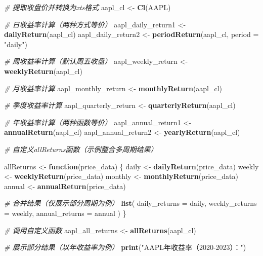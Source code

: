 \documentclass[]{ctexbook}
\newenvironment{Shaded}{\begin{snugshade}}{\end{snugshade}}
\newcommand{\AttributeTok}[1]{\textcolor[rgb]{0.13,0.29,0.53}{#1}}
\newcommand{\CommentTok}[1]{\textcolor[rgb]{0.56,0.35,0.01}{\textit{#1}}}
\newcommand{\ControlFlowTok}[1]{\textcolor[rgb]{0.13,0.29,0.53}{\textbf{#1}}}
\newcommand{\FunctionTok}[1]{\textcolor[rgb]{0.13,0.29,0.53}{\textbf{#1}}}
\newcommand{\NormalTok}[1]{#1}
\newcommand{\OtherTok}[1]{\textcolor[rgb]{0.56,0.35,0.01}{#1}}
\newcommand{\StringTok}[1]{\textcolor[rgb]{0.31,0.60,0.02}{#1}}
\begin{document}
\begin{Shaded}
\begin{Highlighting}[]
\CommentTok{\# 提取收盘价并转换为xts格式}
\NormalTok{aapl\_cl }\OtherTok{\textless{}{-}} \FunctionTok{Cl}\NormalTok{(AAPL)}

\CommentTok{\# 日收益率计算（两种方式等价）}
\NormalTok{aapl\_daily\_return1 }\OtherTok{\textless{}{-}} \FunctionTok{dailyReturn}\NormalTok{(aapl\_cl)}
\NormalTok{aapl\_daily\_return2 }\OtherTok{\textless{}{-}} \FunctionTok{periodReturn}\NormalTok{(aapl\_cl, }\AttributeTok{period =} \StringTok{"daily"}\NormalTok{)}

\CommentTok{\# 周收益率计算（默认周五收盘）}
\NormalTok{aapl\_weekly\_return }\OtherTok{\textless{}{-}} \FunctionTok{weeklyReturn}\NormalTok{(aapl\_cl)}

\CommentTok{\# 月收益率计算}
\NormalTok{aapl\_monthly\_return }\OtherTok{\textless{}{-}} \FunctionTok{monthlyReturn}\NormalTok{(aapl\_cl)}

\CommentTok{\# 季度收益率计算}
\NormalTok{aapl\_quarterly\_return }\OtherTok{\textless{}{-}} \FunctionTok{quarterlyReturn}\NormalTok{(aapl\_cl)}

\CommentTok{\# 年收益率计算（两种函数等价）}
\NormalTok{aapl\_annual\_return1 }\OtherTok{\textless{}{-}} \FunctionTok{annualReturn}\NormalTok{(aapl\_cl)}
\NormalTok{aapl\_annual\_return2 }\OtherTok{\textless{}{-}} \FunctionTok{yearlyReturn}\NormalTok{(aapl\_cl)}

\CommentTok{\# 自定义allReturns函数（示例整合多周期结果）}

\NormalTok{allReturns }\OtherTok{\textless{}{-}} \ControlFlowTok{function}\NormalTok{(price\_data) \{}
\NormalTok{  daily }\OtherTok{\textless{}{-}} \FunctionTok{dailyReturn}\NormalTok{(price\_data)}
\NormalTok{  weekly }\OtherTok{\textless{}{-}} \FunctionTok{weeklyReturn}\NormalTok{(price\_data)}
\NormalTok{  monthly }\OtherTok{\textless{}{-}} \FunctionTok{monthlyReturn}\NormalTok{(price\_data)}
\NormalTok{  annual }\OtherTok{\textless{}{-}} \FunctionTok{annualReturn}\NormalTok{(price\_data)}
  
  \CommentTok{\# 合并结果（仅展示部分周期为例）}
  \FunctionTok{list}\NormalTok{(}
    \AttributeTok{daily\_returns =}\NormalTok{ daily,}
    \AttributeTok{weekly\_returns =}\NormalTok{ weekly,}
    \AttributeTok{annual\_returns =}\NormalTok{ annual}
\NormalTok{  )}
\NormalTok{\}}

\CommentTok{\# 调用自定义函数}
\NormalTok{aapl\_all\_returns }\OtherTok{\textless{}{-}} \FunctionTok{allReturns}\NormalTok{(aapl\_cl)}

\CommentTok{\# 展示部分结果（以年收益率为例）}
\FunctionTok{print}\NormalTok{(}\StringTok{"AAPL年收益率（2020{-}2023）："}\NormalTok{)}
\end{Highlighting}
\end{Shaded}
\end{document}
